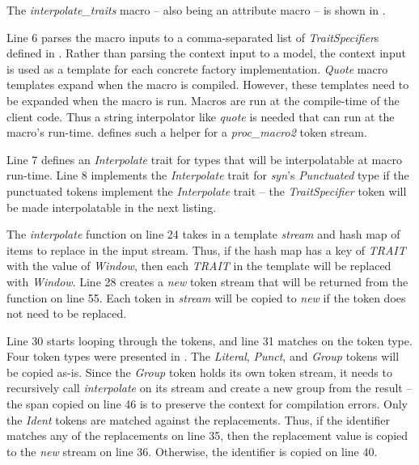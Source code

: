 
The \textit{interpolate\_traits} macro -- also being an attribute macro -- is shown in .


Line 6 parses the macro inputs to a comma-separated list of \textit{TraitSpecifier}s defined in .
Rather than parsing the context input to a model, the context input is used as a template for each concrete factory implementation.
\textit{Quote} macro templates expand when the macro is compiled.
However, these templates need to be expanded when the macro is run.
Macros are run at the compile-time of the client code.
Thus a string interpolator like \textit{quote} is needed that can run at the macro's run-time.
 defines such a helper for a \textit{proc\_macro2} token stream.


Line 7 defines an \textit{Interpolate} trait for types that will be interpolatable at macro run-time.
Line 8 implements the \textit{Interpolate} trait for \textit{syn}'s \textit{Punctuated} type if the punctuated tokens implement the \textit{Interpolate} trait -- the \textit{TraitSpecifier} token will be made interpolatable in the next listing.

The \textit{interpolate} function on line 24 takes in a template \textit{stream} and hash map of items to replace in the input stream.
Thus, if the hash map has a key of \textit{TRAIT} with the value of \textit{Window}, then each \textit{TRAIT} in the template will be replaced with \textit{Window}.
Line 28 creates a \textit{new} token stream that will be returned from the function on line 55.
Each token in \textit{stream} will be copied to \textit{new} if the token does not need to be replaced.

Line 30 starts looping through the tokens, and line 31 matches on the token type.
Four token types were presented in .
The \textit{Literal}, \textit{Punct}, and \textit{Group} tokens will be copied as-is.
Since the \textit{Group} token holds its own token stream, it needs to recursively call \textit{interpolate} on its stream and create a new group from the result -- the span copied on line 46 is to preserve the context for compilation errors.
Only the \textit{Ident} tokens are matched against the replacements.
Thus, if the identifier matches any of the replacements on line 35, then the replacement value is copied to the \textit{new} stream on line 36.
Otherwise, the identifier is copied on line 40.

